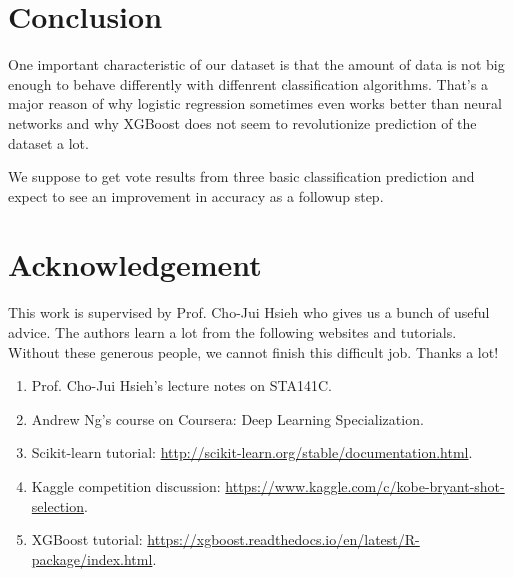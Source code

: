 \documentclass[a4paper,11pt,onecolumn,twoside]{article}
\begin{document}
\section{Conclusion}
One important characteristic of our dataset is that the amount of data is not big enough to behave differently with diffenrent classification algorithms. That's a major reason of why logistic regression sometimes even works better than neural networks and why XGBoost does not seem to revolutionize prediction of the dataset a lot.\par
We suppose to get vote results from three basic classification prediction and expect to see an improvement in accuracy as a followup step.
\section{Acknowledgement}
This work is supervised by Prof. Cho-Jui Hsieh who gives us a bunch of useful advice. The authors learn a lot from the following websites and tutorials. Without these generous people, we cannot finish this difficult job. Thanks a lot!
\begin{enumerate}
	\item Prof. Cho-Jui Hsieh's lecture notes on STA141C.
 	\item Andrew Ng's course on Coursera: Deep Learning Specialization.
	\item Scikit-learn tutorial: \url{http://scikit-learn.org/stable/documentation.html}.
	\item Kaggle competition discussion: \url{https://www.kaggle.com/c/kobe-bryant-shot-selection}.
	\item XGBoost tutorial: \url{https://xgboost.readthedocs.io/en/latest/R-package/index.html}.
\end{enumerate}
\end{document}
